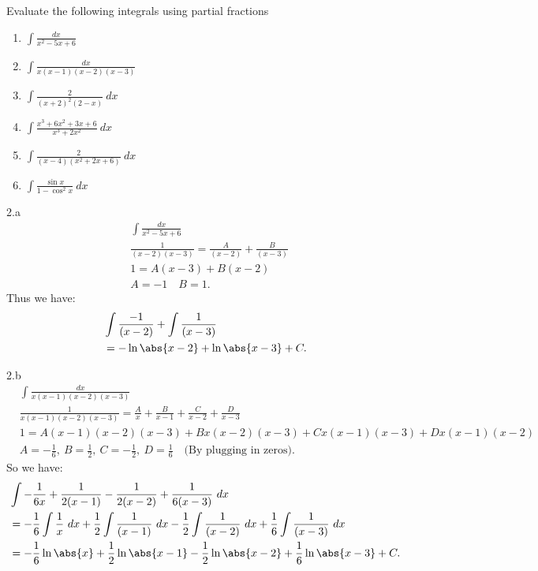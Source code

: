 \documentclass{report}
\begin{document}
    \pagebreak 
    \begin{mdframed}
        Evaluate the following integrals using partial fractions
        \begin{enumerate}[label=(\alph*)]
            \item $\int \frac{dx}{x^{2}-5x+6}$ 
            \item $\int \frac{dx}{x(x-1)(x-2)(x-3)}$ 
            \item $\int \frac{2}{(x+2)^{2}(2-x)}\ dx$
            \item $\int \frac{x^{3}+6x^{2} +3x  +6 }{ x^{3} + 2x^{2}}\ dx$
            \item $\int \frac{2}{ (x-4)( x^{2}+2x+6)}\ dx$
            \item $\int \frac{\sin{x}}{1-\cos^{2}{x}}\ dx$
        \end{enumerate}
    \end{mdframed}

    \bigbreak \noindent 
    2.a
    \bigbreak \noindent 
    \begin{align*}
        &\int \frac{dx}{x^{2}-5x+6}  \\
        &\frac{1}{(x-2)(x-3)} = \frac{A}{(x-2)}  + \frac{B}{(x-3)} \\
        & 1= A(x-3) + B(x-2) \\
        &A = -1 \quad B = 1
    .\end{align*}
    \bigbreak \noindent 
    Thus we have:
    \begin{align*}
        &\int \frac{-1}{(x-2)} + \int \frac{1}{(x-3)} \\
        &=-\ln{\abs{x-2}} + \ln{\abs{x-3}} + C
    .\end{align*}

    \bigbreak \noindent 
    2.b
    \bigbreak \noindent 
    \begin{align*}
        &\int \frac{dx}{x(x-1)(x-2)(x-3)} \\
        &\frac{1}{x(x-1)(x-2)(x-3)} = \frac{A}{x} + \frac{B}{x-1} + \frac{C}{x-2} + \frac{D}{x-3} \\
        &1=A(x-1)(x-2)(x-3) + Bx(x-2)(x-3) + Cx(x-1)(x-3) + Dx(x-1)(x-2) \\
        &A = -\frac{1}{6},\ B=\frac{1}{2},\ C=-\frac{1}{2},\ D=\frac{1}{6}\quad \text{(By plugging in zeros)}
    .\end{align*}
    \bigbreak \noindent 
    So we have:
    \begin{align*}
       &\int -\frac{1}{6x}  +\frac{1}{2(x-1)} -\frac{1}{2(x-2)} + \frac{1}{6(x-3)}\ dx \\
       &=-\frac{1}{6}\int \frac{1}{x}\ dx + \frac{1}{2}\int \frac{1}{(x-1)}\ dx - \frac{1}{2}\int  \frac{1}{(x-2)}\ dx + \frac{1}{6}\int \frac{1}{(x-3)}\ dx \\
       &=-\frac{1}{6}\ln{\abs{x}} +\frac{1}{2}\ln{\abs{x-1}} -\frac{1}{2}\ln{\abs{x-2}} +\frac{1}{6}\ln{\abs{x-3}} + C
    .\end{align*}
\end{document}
